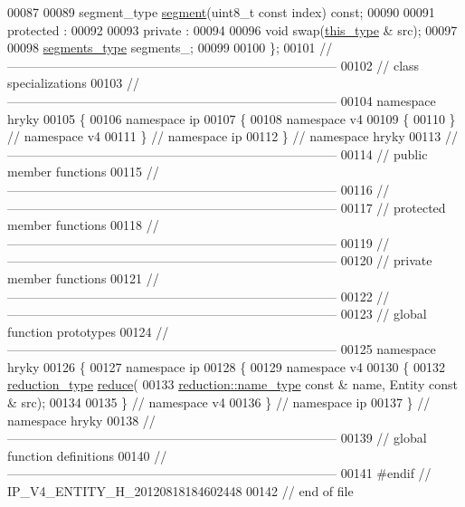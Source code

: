 \begin{DoxyCode}
00087     
00089     segment\_type \hyperlink{classhryky_1_1ip_1_1v4_1_1_entity_a76958c6a4a54d81c61e050581a877c91}{segment}(uint8\_t \textcolor{keyword}{const} index) \textcolor{keyword}{const};
00090 
00091 \textcolor{keyword}{protected} :
00092 
00093 \textcolor{keyword}{private} :
00094 
00096     \textcolor{keywordtype}{void} swap(\hyperlink{classhryky_1_1ip_1_1v4_1_1_entity}{this_type} & src);
00097 
00098     \hyperlink{classhryky_1_1_array}{segments_type}   segments\_;
00099 
00100 \};
00101 \textcolor{comment}{//
      ------------------------------------------------------------------------------}
00102 \textcolor{comment}{// class specializations}
00103 \textcolor{comment}{//
      ------------------------------------------------------------------------------}
00104 \textcolor{keyword}{namespace }hryky
00105 \{
00106 \textcolor{keyword}{namespace }ip
00107 \{
00108 \textcolor{keyword}{namespace }v4
00109 \{
00110 \} \textcolor{comment}{// namespace v4}
00111 \} \textcolor{comment}{// namespace ip}
00112 \} \textcolor{comment}{// namespace hryky}
00113 \textcolor{comment}{//
      ------------------------------------------------------------------------------}
00114 \textcolor{comment}{// public member functions}
00115 \textcolor{comment}{//
      ------------------------------------------------------------------------------}
00116 \textcolor{comment}{//
      ------------------------------------------------------------------------------}
00117 \textcolor{comment}{// protected member functions}
00118 \textcolor{comment}{//
      ------------------------------------------------------------------------------}
00119 \textcolor{comment}{//
      ------------------------------------------------------------------------------}
00120 \textcolor{comment}{// private member functions}
00121 \textcolor{comment}{//
      ------------------------------------------------------------------------------}
00122 \textcolor{comment}{//
      ------------------------------------------------------------------------------}
00123 \textcolor{comment}{// global function prototypes}
00124 \textcolor{comment}{//
      ------------------------------------------------------------------------------}
00125 \textcolor{keyword}{namespace }hryky
00126 \{
00127 \textcolor{keyword}{namespace }ip
00128 \{
00129 \textcolor{keyword}{namespace }v4
00130 \{
00132     \hyperlink{namespacehryky_a343a9a4c36a586be5c2693156200eadc}{reduction_type} \hyperlink{namespacehryky_af41cb3af6766761da0ff21b84527a52c}{reduce}(
00133         \hyperlink{namespacehryky_1_1reduction_ac686c30a4c8d196bbd0f05629a6b921f}{reduction::name_type} \textcolor{keyword}{const} & name, Entity \textcolor{keyword}{const} & src);
00134 
00135 \} \textcolor{comment}{// namespace v4}
00136 \} \textcolor{comment}{// namespace ip}
00137 \} \textcolor{comment}{// namespace hryky}
00138 \textcolor{comment}{//
      ------------------------------------------------------------------------------}
00139 \textcolor{comment}{// global function definitions}
00140 \textcolor{comment}{//
      ------------------------------------------------------------------------------}
00141 \textcolor{preprocessor}{#endif // IP\_V4\_ENTITY\_H\_20120818184602448}
00142 \textcolor{preprocessor}{}\textcolor{comment}{// end of file}
\end{DoxyCode}

